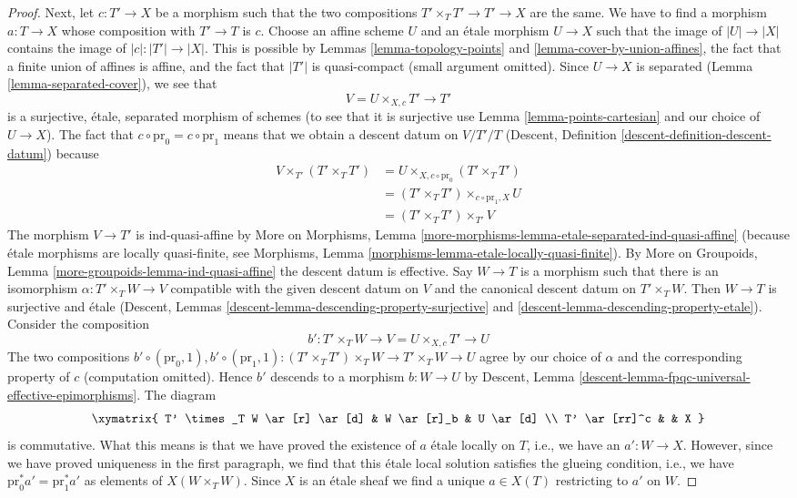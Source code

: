 \begin{proof}
\medskip\noindent
Next, let $c : T' \to X$ be a morphism such that the two compositions
$T' \times_T T' \to T' \to X$ are the same. We have to find a morphism
$a : T \to X$ whose composition with $T' \to T$ is $c$. Choose an
affine scheme $U$ and an \'etale morphism $U \to X$ such that the image
of $|U| \to |X|$ contains the image of $|c| : |T'| \to |X|$.
This is possible by Lemmas \ref{lemma-topology-points} and
\ref{lemma-cover-by-union-affines}, the fact that a finite union of
affines is affine, and the fact that $|T'|$ is quasi-compact
(small argument omitted). Since $U \to X$ is separated
(Lemma \ref{lemma-separated-cover}), we see that
$$
V = U \times_{X, c} T' \longrightarrow T'
$$
is a surjective, \'etale, separated morphism of schemes
(to see that it is surjective use Lemma \ref{lemma-points-cartesian}
and our choice of $U \to X$). The fact that
$c \circ \text{pr}_0 = c \circ \text{pr}_1$ means that we obtain a
descent datum on $V/T'/T$
(Descent, Definition \ref{descent-definition-descent-datum})
because
\begin{align*}
V \times_{T'} (T' \times_T T')
& =
U \times_{X, c \circ \text{pr}_0} (T' \times_T T') \\
& =
(T' \times_T T') \times_{c \circ \text{pr}_1, X} U \\
& =
(T' \times_T T') \times_{T'} V
\end{align*}
The morphism $V \to T'$ is ind-quasi-affine by
More on Morphisms, Lemma
\ref{more-morphisms-lemma-etale-separated-ind-quasi-affine}
(because \'etale morphisms are locally quasi-finite, see
Morphisms, Lemma \ref{morphisms-lemma-etale-locally-quasi-finite}).
By More on Groupoids, Lemma \ref{more-groupoids-lemma-ind-quasi-affine}
the descent datum is effective. Say $W \to T$ is a morphism
such that there is an isomorphism $\alpha : T' \times_T W \to V$
compatible with the given descent datum on $V$ and the canonical descent
datum on $T' \times_T W$. Then $W \to T$ is surjective and \'etale
(Descent, Lemmas \ref{descent-lemma-descending-property-surjective} and
\ref{descent-lemma-descending-property-etale}).
Consider the composition
$$
b' : T' \times_T W \longrightarrow V = U \times_{X, c} T' \longrightarrow U
$$
The two compositions
$b' \circ (\text{pr}_0, 1), 
b' \circ (\text{pr}_1, 1) :
(T' \times_T T') \times_T W \to T' \times_T W \to U$
agree by our choice of $\alpha$ and the corresponding property of $c$
(computation omitted). Hence $b'$ descends to a morphism $b : W \to U$ by
Descent, Lemma \ref{descent-lemma-fpqc-universal-effective-epimorphisms}.
The diagram
$$
\xymatrix{
T' \times_T W \ar[r] \ar[d] & W \ar[r]_b & U \ar[d] \\
T' \ar[rr]^c &  & X
}
$$
is commutative. What this means is that we have proved the existence
of $a$ \'etale locally on $T$, i.e., we have an $a' : W \to X$.
However, since we have proved uniqueness
in the first paragraph, we find that this \'etale local solution
satisfies the glueing condition, i.e., we have
$\text{pr}_0^*a' = \text{pr}_1^*a'$ as elements of $X(W \times_T W)$.
Since $X$ is an \'etale sheaf we find a unique $a \in X(T)$ restricting
to $a'$ on $W$.
\end{proof}
